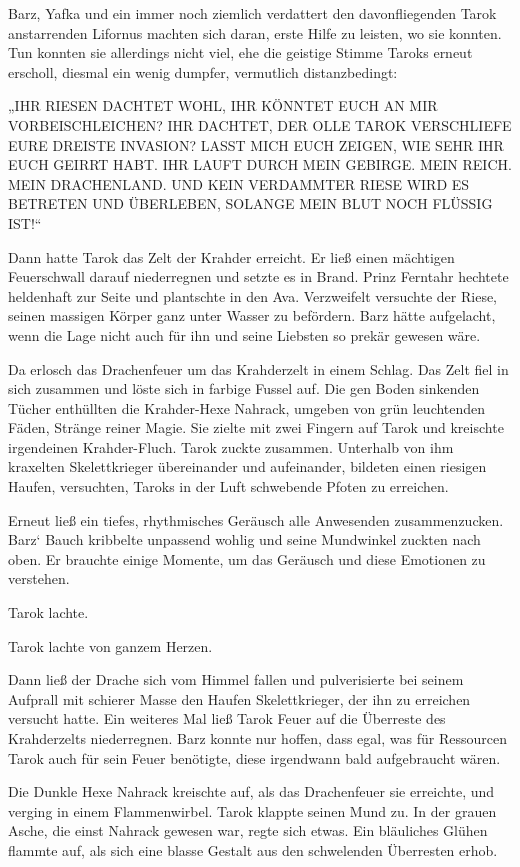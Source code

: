 Barz, Yafka und ein immer noch ziemlich verdattert den davonfliegenden Tarok anstarrenden Lifornus machten sich daran, erste Hilfe zu leisten, wo sie konnten. Tun konnten sie allerdings nicht viel, ehe die geistige Stimme Taroks erneut erscholl, diesmal ein wenig dumpfer, vermutlich distanzbedingt:

„IHR RIESEN DACHTET WOHL, IHR KÖNNTET EUCH AN MIR VORBEISCHLEICHEN? IHR DACHTET, DER OLLE TAROK VERSCHLIEFE EURE DREISTE INVASION? LASST MICH EUCH ZEIGEN, WIE SEHR IHR EUCH GEIRRT HABT. IHR LAUFT DURCH MEIN GEBIRGE. MEIN REICH. MEIN DRACHENLAND. UND KEIN VERDAMMTER RIESE WIRD ES BETRETEN UND ÜBERLEBEN, SOLANGE MEIN BLUT NOCH FLÜSSIG IST!“

Dann hatte Tarok das Zelt der Krahder erreicht. Er ließ einen mächtigen Feuerschwall darauf niederregnen und setzte es in Brand. Prinz Ferntahr hechtete heldenhaft zur Seite und plantschte in den Ava. Verzweifelt versuchte der Riese, seinen massigen Körper ganz unter Wasser zu befördern. Barz hätte aufgelacht, wenn die Lage nicht auch für ihn und seine Liebsten so prekär gewesen wäre.

Da erlosch das Drachenfeuer um das Krahderzelt in einem Schlag. Das Zelt fiel in sich zusammen und löste sich in farbige Fussel auf. Die gen Boden sinkenden Tücher enthüllten die Krahder-Hexe Nahrack, umgeben von grün leuchtenden Fäden, Stränge reiner Magie. Sie zielte mit zwei Fingern auf Tarok und kreischte irgendeinen Krahder-Fluch. Tarok zuckte zusammen. Unterhalb von ihm kraxelten Skelettkrieger übereinander und aufeinander, bildeten einen riesigen Haufen, versuchten, Taroks in der Luft schwebende Pfoten zu erreichen.

Erneut ließ ein tiefes, rhythmisches Geräusch alle Anwesenden zusammenzucken. Barz‘ Bauch kribbelte unpassend wohlig und seine Mundwinkel zuckten nach oben. Er brauchte einige Momente, um das Geräusch und diese Emotionen zu verstehen.

Tarok lachte.

Tarok lachte von ganzem Herzen.

Dann ließ der Drache sich vom Himmel fallen und pulverisierte bei seinem Aufprall mit schierer Masse den Haufen Skelettkrieger, der ihn zu erreichen versucht hatte. Ein weiteres Mal ließ Tarok Feuer auf die Überreste des Krahderzelts niederregnen. Barz konnte nur hoffen, dass egal, was für Ressourcen Tarok auch für sein Feuer benötigte, diese irgendwann bald aufgebraucht wären.

Die Dunkle Hexe Nahrack kreischte auf, als das Drachenfeuer sie erreichte, und verging in einem Flammenwirbel. Tarok klappte seinen Mund zu. In der grauen Asche, die einst Nahrack gewesen war, regte sich etwas. Ein bläuliches Glühen flammte auf, als sich eine blasse Gestalt aus den schwelenden Überresten erhob.


